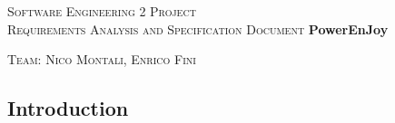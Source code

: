 \documentclass[a4paper,12pt,oneside]{book}
\begin{document}
	
	\pagestyle{empty}\centering
	\textsc{\Large Software Engineering 2 Project\\}
	\textsc{Requirements Analysis and Specification Document}
	\vfill
	\textbf{\Huge PowerEnJoy}
	
	\vfill
	\textsc{\Large Team: Nico Montali, Enrico Fini}
	
	\tableofcontents

	\begin{flushleft}
	\chapter{Introduction}\label{cap:Intro}
	
	\end{flushleft}
\end{document}
